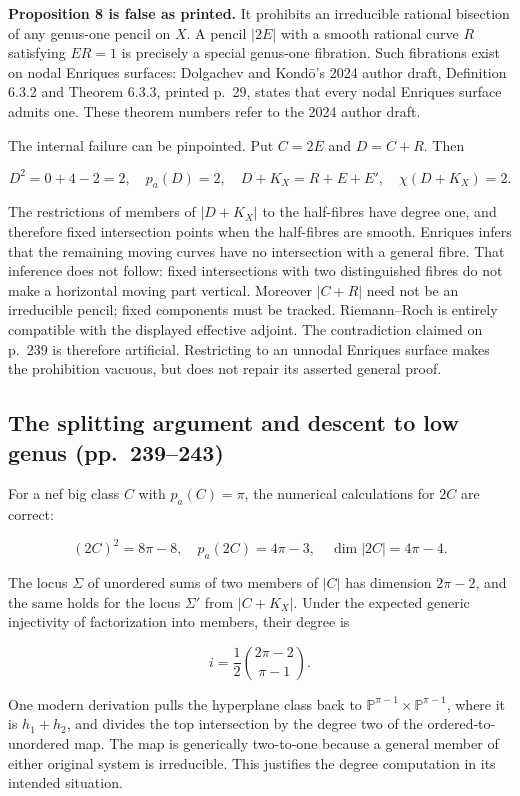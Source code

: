 \textbf{Proposition 8 is false as printed.} It prohibits an irreducible rational bisection of any genus-one pencil on \(X\). A pencil \(\vert 2E\vert \) with a smooth rational curve \(R\) satisfying \(E R=1\) is precisely a special genus-one fibration. Such fibrations exist on nodal Enriques surfaces: Dolgachev and Kond\=o's 2024 author draft, Definition 6.3.2 and Theorem 6.3.3, printed p.~29, states that every nodal Enriques surface admits one. These theorem numbers refer to the 2024 author draft.

The internal failure can be pinpointed. Put \(C=2E\) and \(D=C+R\). Then

\[
D^2=0+4-2=2,\quad p_a(D)=2,\quad
D+K_X=R+E+E',\quad\chi(D+K_X)=2.
\]

The restrictions of members of \(\vert D+K_X\vert \) to the half-fibres have degree one, and therefore fixed intersection points when the half-fibres are smooth. Enriques infers that the remaining moving curves have no intersection with a general fibre. That inference does not follow: fixed intersections with two distinguished fibres do not make a horizontal moving part vertical. Moreover \(\vert C+R\vert \) need not be an irreducible pencil; fixed components must be tracked. Riemann--Roch is entirely compatible with the displayed effective adjoint. The contradiction claimed on p.~239 is therefore artificial. Restricting to an unnodal Enriques surface makes the prohibition vacuous, but does not repair its asserted general proof.

\subsection{The splitting argument and descent to low genus (pp.~239--243)}\label{cp2-vii-1-2}

For a nef big class \(C\) with \(p_a(C)=\pi\), the numerical calculations for \(2C\) are correct:

\[
(2C)^2=8\pi-8,\quad p_a(2C)=4\pi-3,\quad
\dim\vert 2C\vert =4\pi-4.
\]

The locus \(\Sigma\) of unordered sums of two members of \(\vert C\vert \) has dimension \(2\pi-2\), and the same holds for the locus \(\Sigma'\) from \(\vert C+K_X\vert \). Under the expected generic injectivity of factorization into members, their degree is

\[
i=\frac12\binom{2\pi-2}{\pi-1}.
\]

One modern derivation pulls the hyperplane class back to \(\mathbb P^{\pi-1}\times\mathbb P^{\pi-1}\), where it is \(h_1+h_2\), and divides the top intersection by the degree two of the ordered-to-unordered map. The map is generically two-to-one because a general member of either original system is irreducible. This justifies the degree computation in its intended situation.

